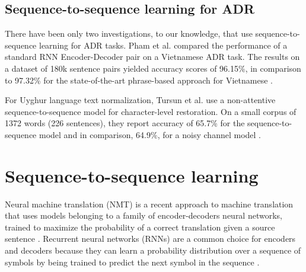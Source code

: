 \documentclass[a4paper]{article}
\begin{document}
\subsection{Sequence-to-sequence learning for ADR}

There have been only two investigations, to our knowledge, that use sequence-to-sequence learning for ADR tasks. Pham et al. compared the performance of a standard RNN Encoder-Decoder pair on a Vietnamese ADR task. The results on a dataset of 180k sentence pairs yielded accuracy scores of 96.15\%, in comparison to 97.32\% for the state-of-the-art phrase-based approach for Vietnamese \cite{pham2017use}.

For Uyghur language text normalization, Tursun et al. use a non-attentive sequence-to-sequence model for character-level restoration. On a small corpus of 1372 words (226 sentences), they report accuracy of 65.7\% for the sequence-to-sequence model and in comparison, 64.9\%, for a noisy channel model \cite{tursun2017noisy}.

\section{Sequence-to-sequence learning}

Neural machine translation (NMT) is a recent approach to machine translation that uses models belonging to a family of encoder-decoders neural networks, trained to maximize the probability of a correct translation given a source sentence \cite{sutskever2014sequence}\cite{cho2014learning}. Recurrent neural networks (RNNs) are a common choice for encoders and decoders because they can learn a probability distribution over a sequence of symbols by being trained to predict the next symbol in the sequence \cite{cho2014learning}. 
\end{document}
